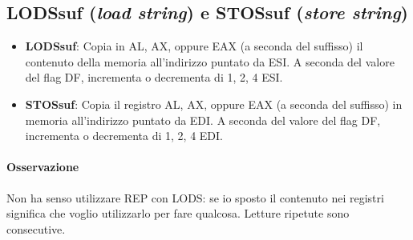 \documentclass[11pt]{report}
\begin{document}
\subsection{LODSsuf (\emph{load string}) e STOSsuf (\emph{store string})}
\begin{itemize}
\item \textbf{LODSsuf}: Copia in AL, AX, oppure EAX (a seconda del suffisso) il contenuto della memoria all'indirizzo puntato da ESI. A seconda del valore del flag DF, incrementa o decrementa di 1, 2, 4 ESI.
\item \textbf{STOSsuf}: Copia il registro AL, AX, oppure EAX (a seconda del suffisso) in memoria all'indirizzo puntato da EDI. A seconda del valore del flag DF, incrementa o decrementa di 1, 2, 4 EDI.
\end{itemize}
\paragraph{Osservazione} Non ha senso utilizzare REP con LODS: se io sposto il contenuto nei registri significa che voglio utilizzarlo per fare qualcosa. Letture ripetute sono consecutive.
\end{document}
